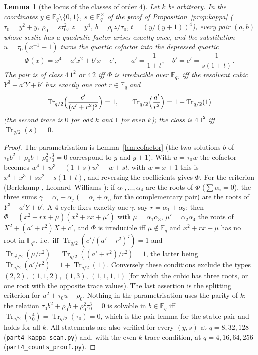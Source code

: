 \documentclass[12pt,a4paper]{amsart}
\newtheorem{lemma}[theorem]{Lemma}
\theoremstyle{definition}
\newcommand{\F}{\mathbb{F}}
\newcommand{\Tr}{\operatorname{Tr}}
\begin{document}
\begin{lemma}[the locus of the classes of order $4$]\label{lem:resolvent}
Let $k$ be arbitrary. In the coordinates $y\in\F_q\setminus\{0,1\}$, $s\in\F_q^\times$ of the proof of Proposition~\ref{prop:kappa} ($\tau_0=y^2+y$, $\rho_0=s\tau_0^2$, $z=y^4$, $b=\rho_0z/\tau_0$, $t=(y/(y+1))^4$), every pair $(a,b)$ whose sextic has a quadratic factor arises exactly once, and the substitution $u=\tau_0(x^{-1}+1)$ turns the quartic cofactor into the depressed quartic
\[
\Phi(x)=x^4+a'x^2+b'x+c',\qquad a'=\frac1{1+t},\quad b'=c'=\frac1{s(1+t)} .
\]
The pair is of class $4\,1^2$ or $4\,2$ iff $\Phi$ is irreducible over $\F_q$, iff the resolvent cubic $Y^3+a'Y+b'$ has exactly one root $r\in\F_q$ and
\[
\Tr_{q/2}\Bigl(\frac{c'}{(a'+r^2)^2}\Bigr)=1,\qquad \Tr_{q/2}\Bigl(\frac{a'}{r^2}\Bigr)=1+\Tr_{q/2}(1)
\]
\textup{(}the second trace is $0$ for odd $k$ and $1$ for even $k$\textup{)}; the class is $4\,1^2$ iff $\Tr_{q/2}(s)=0$.
\end{lemma}
\begin{proof}
The parametrisation is Lemma~\ref{lem:cofactor} (the two solutions $b$ of $\tau_0b^2+\rho_0b+\rho_0^2\tau_0^3=0$ correspond to $y$ and $y+1$). With $u=\tau_0w$ the cofactor becomes $w^4+w^3+(1+s)w^2+w+st$, with $w=x+1$ this is $x^4+x^3+sx^2+s(1+t)$, and reversing the coefficients gives $\Phi$. For the criterion (Berlekamp \cite{Berlekamp}, Leonard--Williams \cite{LeonardWilliams}): if $\alpha_1,\dots,\alpha_4$ are the roots of $\Phi$ ($\sum\alpha_i=0$), the three sums $\gamma=\alpha_i+\alpha_j$ ($=\alpha_l+\alpha_n$ for the complementary pair) are the roots of $Y^3+a'Y+b'$. A $4$-cycle fixes exactly one $\gamma$, say $r=\alpha_1+\alpha_3$; then $\Phi=(x^2+rx+\mu)(x^2+rx+\mu')$ with $\mu=\alpha_1\alpha_3$, $\mu'=\alpha_2\alpha_4$ the roots of $X^2+(a'+r^2)X+c'$, and $\Phi$ is irreducible iff $\mu\notin\F_q$ and $x^2+rx+\mu$ has no root in $\F_{q^2}$, i.e.\ iff $\Tr_{q/2}(c'/(a'+r^2)^2)=1$ and $\Tr_{q^2/2}(\mu/r^2)=\Tr_{q/2}((a'+r^2)/r^2)=1$, the latter being $\Tr_{q/2}(a'/r^2)=1+\Tr_{q/2}(1)$. Conversely these conditions exclude the types $(2,2)$, $(1,1,2)$, $(1,3)$, $(1,1,1,1)$ (for which the cubic has three roots, or one root with the opposite trace values). The last assertion is the splitting criterion for $u^2+\tau_0u+\rho_0$. Nothing in the parametrisation uses the parity of $k$: the relation $\tau_0b^2+\rho_0b+\rho_0^2\tau_0^3=0$ is solvable in $b\in\F_q$ iff $\Tr_{q/2}(\tau_0^4)=\Tr_{q/2}(\tau_0)=0$, which is the pair lemma for the stable pair and holds for all $k$. All statements are also verified for every $(y,s)$ at $q=8,32,128$ (\texttt{part4\_kappa\_scan.py}) and, with the even-$k$ trace condition, at $q=4,16,64,256$ (\texttt{part4\_counts\_proof.py}).
\end{proof}
\end{document}
